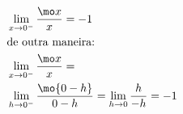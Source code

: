 \begin{ex}
\begin{align}
&\lim_{x\rightarrow 0^-} \frac{\mo x}{x} = -1\nonumber\\
&\text{de outra maneira:}\nonumber\\
&\lim_{x\rightarrow 0^-} \frac{\mo x}{x}=\nonumber\\
&\lim_{h\rightarrow 0^-} \frac{\mo{0-h}}{0-h}=\lim_{h\rightarrow 0} \frac{h}{-h} = -1\nonumber
\end{align}
\end{ex}